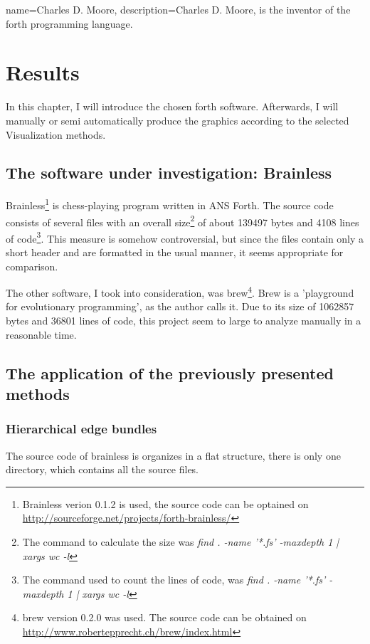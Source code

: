 {
  name={Charles D. Moore},
  description={Charles D. Moore, is the inventor of the forth programming language.}
}

\chapter{Results}
\label{chap:Results}

In this chapter, I will introduce the chosen forth software. Afterwards, I will manually or semi automatically produce the graphics according to the selected Visualization methods.

\section{The software under investigation: Brainless}

Brainless\footnote{Brainless verion 0.1.2 is used, the source code can be optained on \url{http://sourceforge.net/projects/forth-brainless/}} is chess-playing program written in ANS Forth. The source code consists of several files with an overall size\footnote{The command to calculate the size was \emph{find . -name '*.fs' -maxdepth 1 | xargs wc -l}} of about 139497 bytes and 4108 lines of code\footnote{The command used to count the lines of code, was \emph{find . -name '*.fs' -maxdepth 1 | xargs wc -l}}.
This measure is somehow controversial, but since the files contain only a short header and are formatted in the usual manner, it seems appropriate for comparison.

The other software, I took into consideration, was brew\footnote{brew version 0.2.0 was used. The source code can be obtained on \url{http://www.robertepprecht.ch/brew/index.html}}. Brew is a 'playground for evolutionary programming', as the author calls it. Due to its size of 1062857 bytes and 36801 lines of code, this project seem to large to analyze manually in a reasonable time.

\section{The application of the previously presented methods}

\subsection*{Hierarchical edge bundles}

The source code of brainless is organizes in a flat structure, there is only one directory, which contains all the source files.


